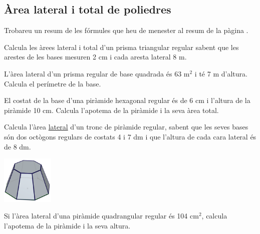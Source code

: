 \subsection{Àrea lateral i total de poliedres}

\begin{theorybox}
	Trobareu un resum de les fórmules que heu de menester al resum de la pàgina \pageref{sec:resum11}.
\end{theorybox}

\begin{mylist}
	
\exer Calcula les àrees lateral i total d'un prisma triangular regular sabent que les arestes de les bases mesuren 2 cm i cada aresta lateral 8 m.

\exer  L'àrea lateral d'un prisma regular de base quadrada és 63 m${}^{2}$ i té 7 m d'altura. Calcula el perímetre de la base.

\exer  El costat de la base d'una piràmide hexagonal regular és de 6 cm i l'altura de la piràmide 10 cm. Calcula l'apotema de la piràmide i la seva àrea total.

\vspace{-1cm}
\exer[1]  \begin{minipage}[t]{0.7\textwidth} Calcula l'àrea \underline{lateral} d'un tronc de piràmide regular, sabent que les seves bases són dos octògons regulars de costats 4 i 7 dm i que l'altura de cada cara lateral és de 8 dm. 
\end{minipage}
\begin{minipage}{0.25\textwidth}
	\vspace{1cm}
	\centering
\includegraphics*[width=2.5cm]{img-11/tronc-octogon.png}
\end{minipage}

\exer[1]  \hot Si l'àrea lateral d'una piràmide quadrangular regular és 104 cm${}^{2}$, calcula l'apotema de la piràmide i la seva altura.
 
\end{mylist}


